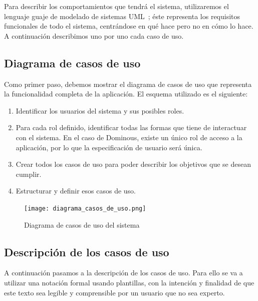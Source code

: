 Para describir los comportamientos que tendrá el sistema, utilizaremos el lenguaje guaje de modelado de sistemas UML~\cite{pressman};
éste representa los requisitos funcionales de todo el sistema, centrándose en qué hace pero no en cómo lo hace.\\

A continuación describimos uno por uno cada caso de uso.

\subsection{Diagrama de casos de uso}

Como primer paso, debemos mostrar el diagrama de casos de uso que representa la funcionalidad completa de la aplicación.
El esquema utilizado es el siguiente:
\begin{enumerate}
    \item Identificar los usuarios del sistema y sus posibles roles.
    \item Para cada rol definido, identificar todas las formas que tiene de interactuar con el sistema. En el caso
            de Dominous, existe un único rol de acceso a la aplicación, por lo que la especificación de usuario
            será única.
    \item Crear todos los casos de uso para poder describir los objetivos que se desean cumplir.
    \item Estructurar y definir esos casos de uso.
\end{enumerate}

\begin{figure}[h]
  \label{diagrama-casos-uso}
  \begin{center}
    \texttt{[image: diagrama\_casos\_de\_uso.png]}
  \end{center}
  \caption{Diagrama de casos de uso del sistema}
\end{figure}


\subsection{Descripción de los casos de uso}


A continuación pasamos a la descripción de los casos de uso. Para ello se va a utilizar una notación formal
usando plantillas, con la intención y finalidad de que este texto sea legible y comprensible por
un usuario que no sea experto.

